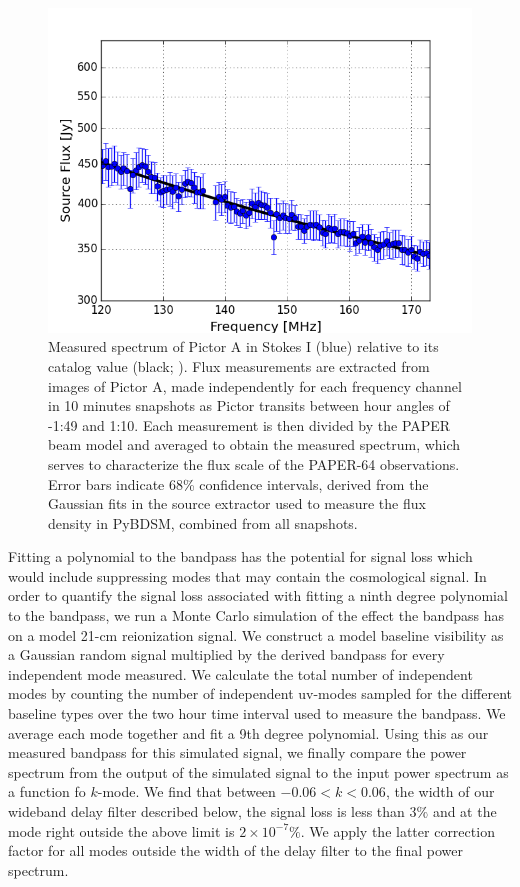 \documentclass[twocolumn,numberedappendix]{emulateapj} \shorttitle{New Limits on the 21 cm Power Spectrum at $z=8.4$}
\begin{document}
\begin{figure}
\centering
\includegraphics[width=\columnwidth]{plots/picspec.png}
\caption{
Measured spectrum of Pictor A in Stokes I (blue) relative to its catalog
value (black; \citealt{jacobs_et_al2013}).  Flux measurements are
extracted from images of Pictor A, made independently for each frequency channel in
10 minutes snapshots as Pictor transits between hour angles of -1:49
and 1:10.  Each measurement is then divided by the PAPER beam model and
averaged to obtain the measured spectrum, which serves to characterize the flux
scale of the PAPER-64 observations. Error bars indicate 68\% confidence
intervals, derived from the Gaussian fits in the source extractor used to
measure the flux density in PyBDSM, combined from all snapshots.
}\label{fig:pic_spec}
\end{figure}


Fitting a polynomial to the bandpass has the potential for signal loss which
would include suppressing modes that may contain the cosmological signal. In order to
quantify the signal loss associated with fitting a ninth degree polynomial to
the bandpass, we run a Monte Carlo simulation of the effect the bandpass has on
a model 21-cm reionization signal. We construct a model baseline visibility as a Gaussian
random signal 
multiplied by the derived bandpass for every independent mode measured. We
calculate the total number of independent modes by counting the number of
independent uv-modes sampled for the different baseline types over the two hour
time interval used to measure the bandpass. We average each mode together and
fit a 9th degree polynomial. Using this as our measured bandpass for this
simulated signal, we finally compare the power spectrum from the output of the
simulated signal to the input power spectrum as a function fo $k$-mode.  We
find that between $-0.06 < k < 0.06$, the width of our wideband delay filter
described below, the signal loss is less than $3\%$ and at the mode right
outside the above limit is $2\times{10^{-7}}\%$. We apply the latter correction
factor for all modes outside the width of the delay filter to the final power
spectrum.
\end{document}
